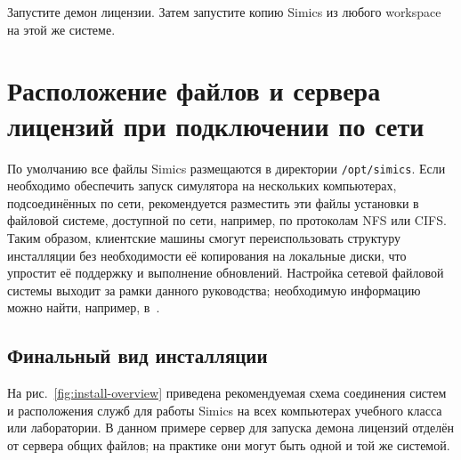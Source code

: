 Запустите демон лицензии. Затем запустите копию Simics из любого workspace на этой же системе.

\section{Расположение файлов и сервера лицензий при подключении по сети}

По умолчанию все файлы Simics размещаются в директории \texttt{/opt/simics}. Если необходимо обеспечить запуск симулятора на нескольких компьютерах, подсоединённых по сети, рекомендуется разместить эти файлы установки в файловой системе, доступной по сети, например, по протоколам NFS или CIFS. Таким образом, клиентские машины смогут переиспользовать структуру инсталляции без необходимости её копирования на локальные диски, что упростит её поддержку и выполнение обновлений. Настройка сетевой файловой системы выходит за рамки данного руководства; необходимую информацию можно найти, например, в~\cite{nfs}.

\subsection{Финальный вид инсталляции}

На рис.~\ref{fig:install-overview} приведена рекомендуемая схема соединения систем и расположения служб для работы Simics на всех компьютерах учебного класса или лаборатории. В данном примере сервер для запуска демона лицензий отделён от сервера общих файлов; на практике они могут быть одной и той же системой.

